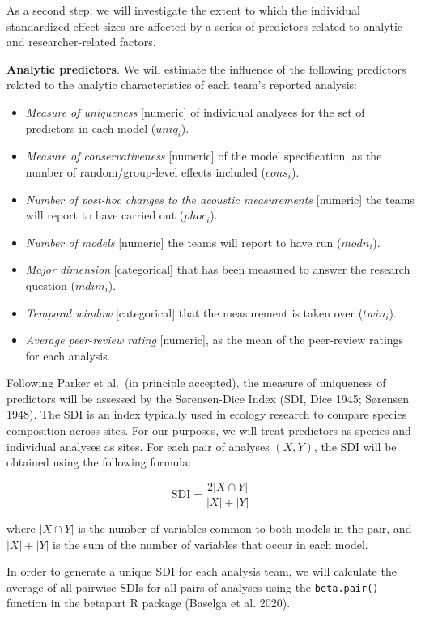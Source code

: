 \documentclass[
  12pt,
]{article}
\providecommand{\tightlist}{%
  \setlength{\itemsep}{0pt}\setlength{\parskip}{0pt}}
\begin{document}
As a second step, we will investigate the extent to which the individual standardized effect sizes are affected by a series of predictors related to analytic and researcher-related factors.

\textbf{Analytic predictors}. We will estimate the influence of the following predictors related to the analytic characteristics of each team's reported analysis:

\begin{itemize}
\tightlist
\item
  \emph{Measure of uniqueness} {[}numeric{]} of individual analyses for the set of predictors in each model (\(uniq_i\)).
\item
  \emph{Measure of conservativeness} {[}numeric{]} of the model specification, as the number of random/group-level effects included (\(cons_i\)).
\item
  \emph{Number of post-hoc changes to the acoustic measurements} {[}numeric{]} the teams will report to have carried out (\(phoc_i\)).
\item
  \emph{Number of models} {[}numeric{]} the teams will report to have run (\(modn_i\)).
\item
  \emph{Major dimension} {[}categorical{]} that has been measured to answer the research question (\(mdim_i\)).
\item
  \emph{Temporal window} {[}categorical{]} that the measurement is taken over (\(twin_i\)).
\item
  \emph{Average peer-review rating} {[}numeric{]}, as the mean of the peer-review ratings for each analysis.
\end{itemize}

Following Parker et al.~(in principle accepted), the measure of uniqueness of predictors will be assessed by the Sørensen-Dice Index (SDI, Dice 1945; Sørensen 1948).
The SDI is an index typically used in ecology research to compare species composition across sites.
For our purposes, we will treat predictors as species and individual analyses as sites.
For each pair of analyses \((X, Y)\), the SDI will be obtained using the following formula:

\[\text{SDI} = \frac{2|X \cap Y|}{|X|+|Y|}\]

where \(|X \cap Y|\) is the number of variables common to both models in the pair, and \(|X|+|Y|\) is the sum of the number of variables that occur in each model.

In order to generate a unique SDI for each analysis team, we will calculate the average of all pairwise SDIs for all pairs of analyses using the \texttt{beta.pair()} function in the betapart R package (Baselga et al. 2020).
\end{document}
